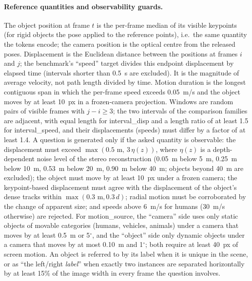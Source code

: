 \paragraph{Reference quantities and observability guards.}
The object position at frame $t$ is the per-frame median of its visible keypoints (for rigid objects the pose applied to the reference points), i.e.\ the same quantity the tokens encode; the camera position is the optical centre from the released poses.
Displacement is the Euclidean distance between the positions at frames $i$ and $j$; the benchmark's ``speed'' target divides this endpoint displacement by elapsed time (intervals shorter than 0.5~s are excluded). It is the magnitude of average velocity, not path length divided by time. Motion duration is the longest contiguous span in which the per-frame speed exceeds 0.05~m/s and the object moves by at least 10~px in a frozen-camera projection.
Windows are random pairs of visible frames with $j-i\ge3$; the two intervals of the comparison families are adjacent, with equal length for interval\_disp and a length ratio of at least 1.5 for interval\_speed, and their displacements (speeds) must differ by a factor of at least 1.4.
A question is generated only if the asked quantity is observable: the displacement must exceed $\max(0.5\text{ m},\,3\,\eta(z))$, where $\eta(z)$ is a depth-dependent noise level of the stereo reconstruction (0.05~m below 5~m, 0.25~m below 10~m, 0.53~m below 20~m, 0.90~m below 40~m; objects beyond 40~m are excluded); the object must move by at least 10~px under a frozen camera; the keypoint-based displacement must agree with the displacement of the object's dense tracks within $\max(0.3\text{ m},0.3\,d)$; radial motion must be corroborated by the change of apparent size; and speeds above 6~m/s for humans (30~m/s otherwise) are rejected.
For motion\_source, the ``camera'' side uses only static objects of movable categories (humans, vehicles, animals) under a camera that moves by at least 0.5~m or 5$^\circ$, and the ``object'' side only dynamic objects under a camera that moves by at most 0.10~m and 1$^\circ$; both require at least 40~px of screen motion.
An object is referred to by its label when it is unique in the scene, or as ``the left/right \emph{label}'' when exactly two instances are separated horizontally by at least 15\% of the image width in every frame the question involves.

